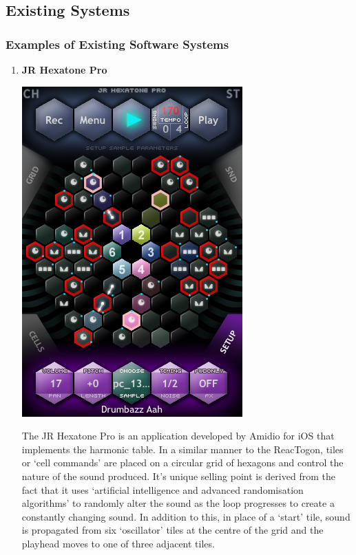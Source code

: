 \documentclass[10pt,a4paper]{article}
\begin{document}
\subsection{Existing Systems}
\subsubsection{Examples of Existing Software Systems}
\begin{enumerate}
\item \textbf{JR Hexatone Pro}
\begin{center}
\includegraphics[scale=0.35]{2.jpg}
\end{center}
The JR Hexatone Pro is an application developed by Amidio for iOS that implements the harmonic table\cite{jrhexitunes}.  In a similar manner to the ReacTogon, tiles or `cell commands’ are placed on a circular grid of hexagons and control the nature of the sound produced. It’s unique selling point is derived from the fact that it uses `artificial intelligence and advanced randomisation algorithms’ to randomly alter the sound as the loop progresses to create a constantly changing sound. In addition to this, in place of a `start’ tile, sound is propagated from six `oscillator’ tiles at the centre of the grid and the playhead moves to one of three adjacent tiles. \cite{amidiomanual}


\end{enumerate}
\end{document}
